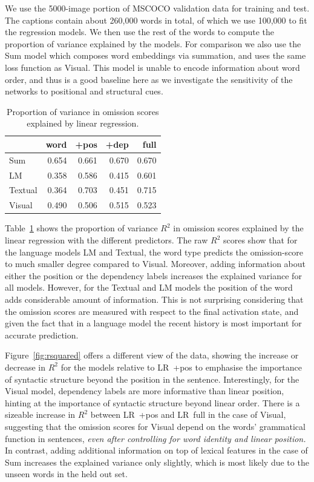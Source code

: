 \noindent We use the 5000-image portion of MSCOCO validation data for
training and test. The captions contain about 260,000 words in total, of
which we use 100,000 to fit the regression models. We then use the rest
of the words to compute the proportion of variance explained by the models.
For comparison we also use the {\sc Sum} model which composes word
embeddings via summation, and uses the same loss function as {\sc
  Visual}. This model is unable to encode information about word
order, and thus is a good baseline here as we investigate the
sensitivity of the networks to positional and structural cues.

\begin{table}
  \centering
  \caption{Proportion of variance in omission scores explained by
    linear regression.}
    \begin{tabular}{l|rrrr}
               & word   & +pos  & +dep  & full \\\hline
     {\sc Sum}       & 0.654  & 0.661 & 0.670 & 0.670 \\
     {\sc LM}        & 0.358  & 0.586 & 0.415 & 0.601 \\
     {\sc Textual}   & 0.364  & 0.703 & 0.451 & 0.715 \\
     {\sc Visual}    & 0.490  & 0.506 & 0.515 & 0.523 \\
    \end{tabular}
    \label{tab:lr-r2}
\end{table}


Table~\ref{tab:lr-r2} shows the proportion of variance $R^2$ in omission
scores explained by the linear regression with the different predictors.
The raw $R^2$ scores show that for the language models {\sc LM} and
{\sc Textual}, the word type predicts the omission-score to much smaller
degree compared to {\sc Visual}. Moreover, adding information about
either the position or the dependency labels increases the explained variance for all models.
However, for the {\sc Textual} and {\sc LM} models the position of the word adds
considerable amount of information. This is not surprising considering that the omission
scores are measured with respect to the final activation state, and
given the fact that in a language model the recent history is most
important for accurate prediction.

Figure~\ref{fig:rsquared} offers a different view of the data, showing
the increase or decrease in $R^2$ for the models relative to {\sc LR~+pos}
to emphasise the importance of syntactic structure beyond the position in the sentence.
Interestingly, for the {\sc Visual} model, dependency labels are
more informative than linear position, hinting at the importance of syntactic
structure beyond linear order. There is a sizeable increase in $R^2$ between
{\sc LR~+pos} and {\sc LR~full} in the case of {\sc Visual}, suggesting that
the omission scores for {\sc Visual} depend on the words'
grammatical function in sentences, {\it even after controlling for word
identity and linear position.}  In contrast, adding additional information on
top of lexical features in the case of {\sc Sum} increases the
explained variance only slightly, which is most likely due to the unseen words
in the held out set.

